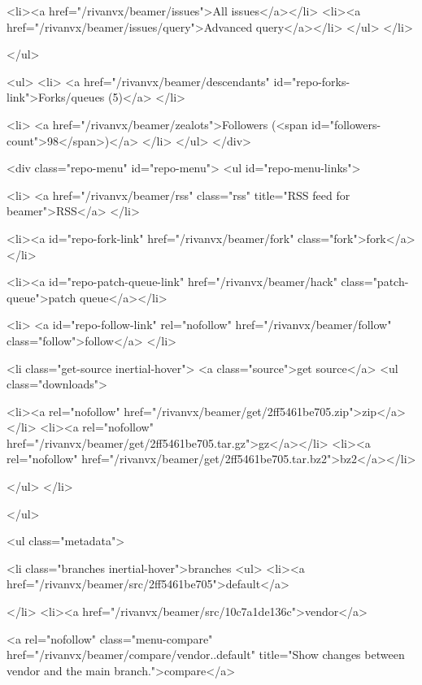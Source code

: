         <li><a href="/rivanvx/beamer/issues">All issues</a></li>
        <li><a href="/rivanvx/beamer/issues/query">Advanced query</a></li>
      </ul>
    </li>

    
  </ul>

  <ul>
    <li>
      <a href="/rivanvx/beamer/descendants" id="repo-forks-link">Forks/queues (5)</a>
    </li>

    <li>
      <a href="/rivanvx/beamer/zealots">Followers (<span id="followers-count">98</span>)</a>
    </li>
  </ul>
</div>



 

  <div class="repo-menu" id="repo-menu">
    <ul id="repo-menu-links">
    
      <li>
        <a href="/rivanvx/beamer/rss" class="rss" title="RSS feed for beamer">RSS</a>
      </li>

      <li><a id="repo-fork-link" href="/rivanvx/beamer/fork" class="fork">fork</a></li>
      
        
          <li><a id="repo-patch-queue-link" href="/rivanvx/beamer/hack" class="patch-queue">patch queue</a></li>
        
      
      <li>
        <a id="repo-follow-link" rel="nofollow" href="/rivanvx/beamer/follow" class="follow">follow</a>
      </li>
      
          
      
      
        <li class="get-source inertial-hover">
          <a class="source">get source</a>
          <ul class="downloads">
            
              
              <li><a rel="nofollow" href="/rivanvx/beamer/get/2ff5461be705.zip">zip</a></li>
              <li><a rel="nofollow" href="/rivanvx/beamer/get/2ff5461be705.tar.gz">gz</a></li>
              <li><a rel="nofollow" href="/rivanvx/beamer/get/2ff5461be705.tar.bz2">bz2</a></li>
            
          </ul>
        </li>
      
    </ul>

  
    <ul class="metadata">
      
      
        <li class="branches inertial-hover">branches
          <ul>
            <li><a href="/rivanvx/beamer/src/2ff5461be705">default</a>
              
              
            </li>
            <li><a href="/rivanvx/beamer/src/10c7a1de136c">vendor</a>
              
              
              <a rel="nofollow" class="menu-compare"
                 href="/rivanvx/beamer/compare/vendor..default"
                 title="Show changes between vendor and the main branch.">compare</a>
              
